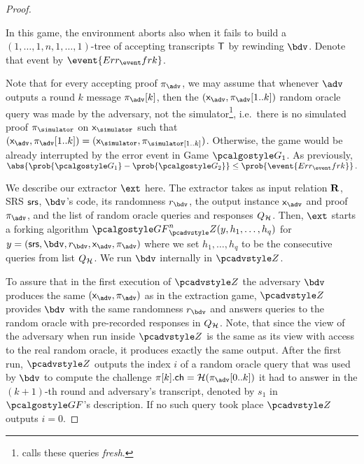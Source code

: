 \begin{proof}
\begin{compactenum}
		\end{compactenum}
		
		In this game, the environment aborts also when it fails to build a
		$(1, \ldots, 1, n, 1, \ldots, 1)$-tree of accepting transcripts $\mathsf{T}$ by rewinding
		$\bdv$. Denote that event by $\event{\errfrk}$.
	
		Note that for every accepting proof $\zkproof_{\advse}$, we may
		assume that whenever $\advse$ outputs a round $k$ message $\zkproof_{\advse}[k]$, then the
		$(\inp_{\advse}, \zkproof_{\advse}[1..k])$ random oracle query was made by the adversary, not
		the simulator\footnote{\cite{INDOCRYPT:FKMV12} calls these queries \emph{fresh}.}, i.e.~there
		is no simulated proof $\zkproof_\simulator$ on $\inp_\simulator$ such that
		$(\inp_{\advse}, \zkproof_{\advse} [1..k]) = (\inp_\simulator,
		\zkproof_\simulator[1..k])$. Otherwise, the game would be already interrupted by the error
		event in Game $\game{1}$.  As previously,
		\( \abs{\prob{\game{1}} - \prob{\game{2}}} \leq \prob{\event{\errfrk}}\,.  \)
		
		We describe our extractor $\ext$ here. The extractor takes as input relation $\mathbf{R}$, SRS
		$\mathsf{srs}$, $\bdv$'s code, its randomness $r_\bdv$, the output instance $\inp_{\advse}$ and proof
		$\zkproof_{\advse}$, and the list of random oracle queries and responses $Q_{\mathcal{H}}$. Then, $\ext$
		starts a forking algorithm $\genforking^{n}_\zdv(y,h_1, \ldots, h_q)$ for
		$y = (\srs, \bdv, r_\bdv, \inp_{\advse}, \zkproof_{\advse})$ where we set $h_1, \ldots, h_q$ to
		be the consecutive queries from list $Q_{\mathcal{H}}$. We run $\bdv$ internally in $\zdv$.
		
		To assure that in the first execution of $\zdv$ the adversary $\bdv$ produces the same
		$(\inp_{\advse}, \zkproof_{\advse})$ as in the extraction game, $\zdv$ provides $\bdv$ with
		the same randomness $r_\bdv$ and answers queries to the random oracle with
		pre-recorded responses in $Q_{\mathcal{H}}$.
		Note, that since the view of the adversary when run inside $\zdv$ is the same as its view with
		access to the real random oracle, it produces exactly the same output. After the
		first run, $\zdv$ outputs the index $i$ of a random oracle query that was used by $\bdv$ to
		compute the challenge $\zkproof[k].\ch = \ro(\zkproof_{\advse}[0..k])$ it had to answer in the
		$(k + 1)$-th round and adversary's transcript, denoted by $s_1$ in $\genforking$'s
		description. If no such query took place $\zdv$ outputs $i = 0$.
		

\end{proof}
